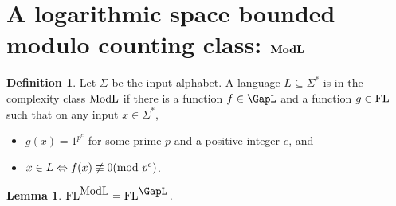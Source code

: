 \documentclass{amsbook}
\newtheorem{lemma}[theorem]{Lemma}
\theoremstyle{definition}
\newtheorem{definition}[theorem]{Definition}
\theoremstyle{remark}
\numberwithin{section}{chapter}
\numberwithin{equation}{chapter}
\newcommand{\ModL}{\mbox{\rm ModL}}
\newcommand{\boldModL}{\mbox{\rm \bf ModL}}
\newcommand{\FL}{\mbox{\rm FL}}
\newcommand{\FLModL}{\mbox{\ensuremath{\FL ^{\ModL}}}}
\newcommand{\FLGapL}{\mbox{\ensuremath{\FL ^{\mbox{\GapL}}}}}
\renewcommand{\mod}{\mbox{\textrm mod~}}
\begin{document}
\section{A logarithmic space bounded modulo counting class: $\boldModL$}
\begin{definition}\label{modldefn}
Let $\Sigma$ be the input alphabet. A language $L\subseteq\Sigma ^{*}$ is in the complexity class $\ModL$ if there is a function $f\in\GapL$ and a function $g\in\FL$ such that on any input $x\in\Sigma^{*}$,
\begin{itemize}
\item $g(x)=1^{p^e}$ for some prime $p$ and a positive integer $e$, and
\item $x\in L\Leftrightarrow f(x)\not \equiv 0(\mod p^e)$.
\end{itemize}
\end{definition}
\begin{lemma}
$\FLModL =\FLGapL$.
\end{lemma}
\end{document}
